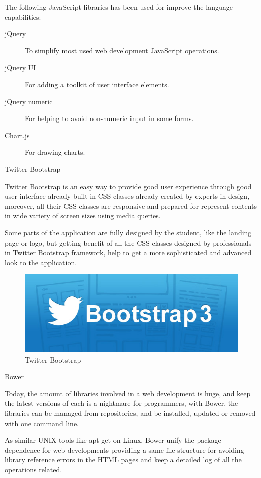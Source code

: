 \documentclass{DeustoFDP}
\begin{document}
The following JavaScript libraries has been used for improve the language capabilities:
\begin{description}
	\item[jQuery] To simplify most used web development JavaScript operations.
	\item[jQuery UI] For adding a toolkit of user interface elements.
	\item[jQuery numeric] For helping to avoid non-numeric input in some forms.
	\item[Chart.js] For drawing charts.
\end{description}

{\large Twitter Bootstrap}

Twitter Bootstrap \cite{Twitterbootstrap} is an easy way to provide good user experience through good user interface already built in CSS classes already created by experts in design, moreover, all their CSS classes are responsive and prepared for represent contents in wide variety of screen sizes using media queries.

Some parts of the application are fully designed by the student, like the landing page or logo, but getting benefit of all the CSS classes designed by professionals in Twitter Bootstrap framework, help to get a more sophisticated and advanced look to the application.

\begin{figure}[h]
\centering
\includegraphics[width=0.7\linewidth]{fig/bootstrap-3}
\caption[Twitter Bootstrap]{Twitter Bootstrap}
\label{fig:bootstrap-3}
\end{figure}


{\large Bower}

Today, the amount of libraries involved in a web development is huge, and keep the latest versions of each is a nightmare for programmers, with Bower, the libraries can be managed from repositories, and be installed, updated or removed with one command line.

As similar UNIX tools like apt-get on Linux, Bower unify the package dependence for web developments providing a same file structure for avoiding library reference errors in the HTML pages and keep a detailed log of all the operations related.
\end{document}
